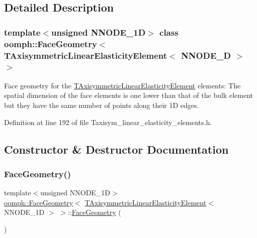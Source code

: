 \subsection{Detailed Description}
\subsubsection*{template$<$unsigned N\+N\+O\+D\+E\+\_\+1D$>$\newline
class oomph\+::\+Face\+Geometry$<$ T\+Axisymmetric\+Linear\+Elasticity\+Element$<$ N\+N\+O\+D\+E\+\_\+D $>$ $>$}

Face geometry for the \hyperlink{classoomph_1_1TAxisymmetricLinearElasticityElement}{T\+Axisymmetric\+Linear\+Elasticity\+Element} elements\+: The spatial dimension of the face elements is one lower than that of the bulk element but they have the same number of points along their 1D edges. 

Definition at line 192 of file Taxisym\+\_\+linear\+\_\+elasticity\+\_\+elements.\+h.



\subsection{Constructor \& Destructor Documentation}
\mbox{\label{classoomph_1_1FaceGeometry_3_01TAxisymmetricLinearElasticityElement_3_01NNODE__1D_01_4_01_4_ae531d448e78de388d5bdccf251e94804}} 
\subsubsection{\texorpdfstring{Face\+Geometry()}{FaceGeometry()}}
{\footnotesize\ttfamily template$<$unsigned N\+N\+O\+D\+E\+\_\+1D$>$ \\
\hyperlink{classoomph_1_1FaceGeometry}{oomph\+::\+Face\+Geometry}$<$ \hyperlink{classoomph_1_1TAxisymmetricLinearElasticityElement}{T\+Axisymmetric\+Linear\+Elasticity\+Element}$<$ N\+N\+O\+D\+E\+\_\+1D $>$ $>$\+::\hyperlink{classoomph_1_1FaceGeometry}{Face\+Geometry} (\begin{DoxyParamCaption}{ }\end{DoxyParamCaption})\hspace{0.3cm}{\ttfamily [inline]}}



